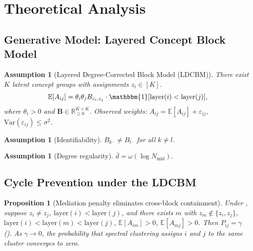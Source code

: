 \documentclass[11pt]{article}
\newtheorem{proposition}[theorem]{Proposition}
\newtheorem{assumption}[theorem]{Assumption}
\newcommand{\bB}{\mathbf{B}}
\newcommand{\R}{\mathbb{R}}
\newcommand{\E}{\mathbb{E}}
\newcommand{\1}{\mathbbm{1}}
\newcommand{\eps}{\varepsilon}
\begin{document}
\section{Theoretical Analysis}
\label{sec:theory}

\subsection{Generative Model: Layered Concept Block Model}
\label{sec:model}

\begin{assumption}[Layered Degree-Corrected Block Model (LDCBM)]
\label{ass:block}
  There exist $K$ latent concept groups with assignments $z_i \in [K]$.
  \begin{equation}
    \E[A_{ij}] = \theta_i \theta_j B_{z_i, z_j} \cdot \1[\mathrm{layer}(i) < \mathrm{layer}(j)],
    \label{eq:ldcbm}
  \end{equation}
  where $\theta_i > 0$ and $\bB \in \R^{K \times K}_{\ge 0}$.
  Observed weights: $A_{ij} = \E[A_{ij}] + \eps_{ij}$, $\mathrm{Var}(\eps_{ij}) \le \sigma^2$.
\end{assumption}

\begin{assumption}[Identifiability]
\label{ass:ident}
  $B_{k\cdot} \ne B_{l\cdot}$ for all $k \ne l$.
\end{assumption}

\begin{assumption}[Degree regularity]
\label{ass:degree}
  $\bar{d} = \omega(\log N_{\mathrm{mid}})$.
\end{assumption}

\subsection{Cycle Prevention under the LDCBM}
\label{sec:cycle-theory}

\begin{proposition}[Mediation penalty eliminates cross-block containment]
\label{prop:mediation-prevents-cycle}
  Under , suppose $z_i \ne z_j$, $\mathrm{layer}(i) < \mathrm{layer}(j)$, and there exists $m$ with $z_m \notin \{z_i, z_j\}$, $\mathrm{layer}(i) < \mathrm{layer}(m) < \mathrm{layer}(j)$, $\E[A_{im}] > 0$, $\E[A_{mj}] > 0$.
  Then $P_{ij} = \gamma$ ().
  As $\gamma \to 0$, the probability that spectral clustering assigns $i$ and $j$ to the same cluster converges to zero.
\end{proposition}
\end{document}
